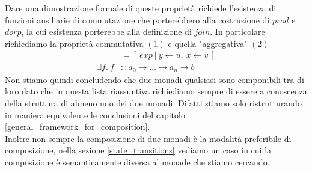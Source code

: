 Dare una dimostrazione formale di queste proprietà richiede l'esistenza di funzioni
ausiliarie di commutazione che porterebbero alla costruzione di $prod$ e $dorp$, la cui
esistenza porterebbe alla definizione di $join$.
In particolare richiediamo la proprietà commutativa $(1)$ e quella "aggregativa" $(2)$
\begin{align}
  [\ exp\ |\ x \leftarrow v,\ y \leftarrow u\ ] &= [\ exp\ |\ y \leftarrow u,\ x \leftarrow v\ ]\\
  \exists f.\ f &:: a_0 \to \dots \to a_n \to b
\end{align}
Non stiamo quindi concludendo che due monadi qualsiasi sono componibili tra di loro
dato che in questa lista riassuntiva richiediamo sempre di essere a conoscenza della
struttura di almeno uno dei due monadi.
Difatti stiamo solo ristrutturando in maniera equivalente le conclusioni del capitolo
\ref{general_framework_for_composition}.\\
Inoltre non sempre la composizione di due monadi è la modalità preferibile di composizione,
nella sezione \ref{state_transitions} vediamo un caso in cui la composizione
è semanticamente diversa al monade che stiamo cercando.

\vfill